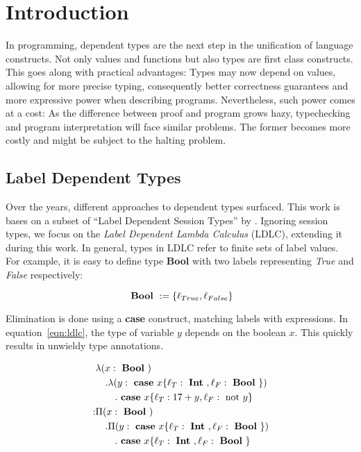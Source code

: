\chapter{Introduction}\label{chap:introduction}

In programming, dependent types are the next step in the unification of language constructs. Not only values and functions but also types are first class constructs. This goes along with practical advantages: Types may now depend on values, allowing for more precise typing, consequently better correctness guarantees and more expressive power when describing programs. Nevertheless, such power comes at a cost: As the difference between proof and program grows hazy, typechecking and program interpretation will face similar problems. The former becomes more costly and might be subject to the halting problem.

\section{Label Dependent Types}

Over the years, different approaches to dependent types surfaced. This work is bases on a subset of ``Label Dependent Session Types'' by \cite{thiemann2019}. Ignoring session types, we focus on the \emph{Label Dependent Lambda Calculus} (LDLC), extending it during this work. In general, types in LDLC refer to finite sets of label values. For example, it is easy to define type \textbf{Bool} with two labels representing \emph{True} and \emph{False} respectively:

\begin{equation}\label{eqn:bool}
\text{ \textbf{Bool} }    := \{\ell_{True}, \ell_{False}\}
\end{equation}

Elimination is done using a \textbf{case} construct, matching labels with expressions. In equation~\ref{eqn:ldlc}, the type of variable $y$ depends on the boolean $x$. This quickly results in unwieldy type annotations.

\begin{equation}\label{eqn:ldlc}
\begin{split}
&\lambda (x: \text{ \textbf{Bool} }) \\
&\quad . \lambda (y: \text{ \textbf{case} } x \{\ell_T: \text{ \textbf{Int} }, \ell_F: \text{ \textbf{Bool} }\} ) \\
&\qquad . \text{ \textbf{case} } x \{\ell_T: 17+y,\ell_F: \text{ not } y\} \\
: & \Pi(x : \text{ \textbf{Bool} }) \\
&\quad . \Pi (y: \text{ \textbf{case} } x \{\ell_T: \text{ \textbf{Int} }, \ell_F: \text{ \textbf{Bool} }\} ) \\
&\qquad . \text{ \textbf{case} } x \{\ell_T: \text{ \textbf{Int} }, \ell_F: \text{ \textbf{Bool} } \}
\end{split}
\end{equation}

